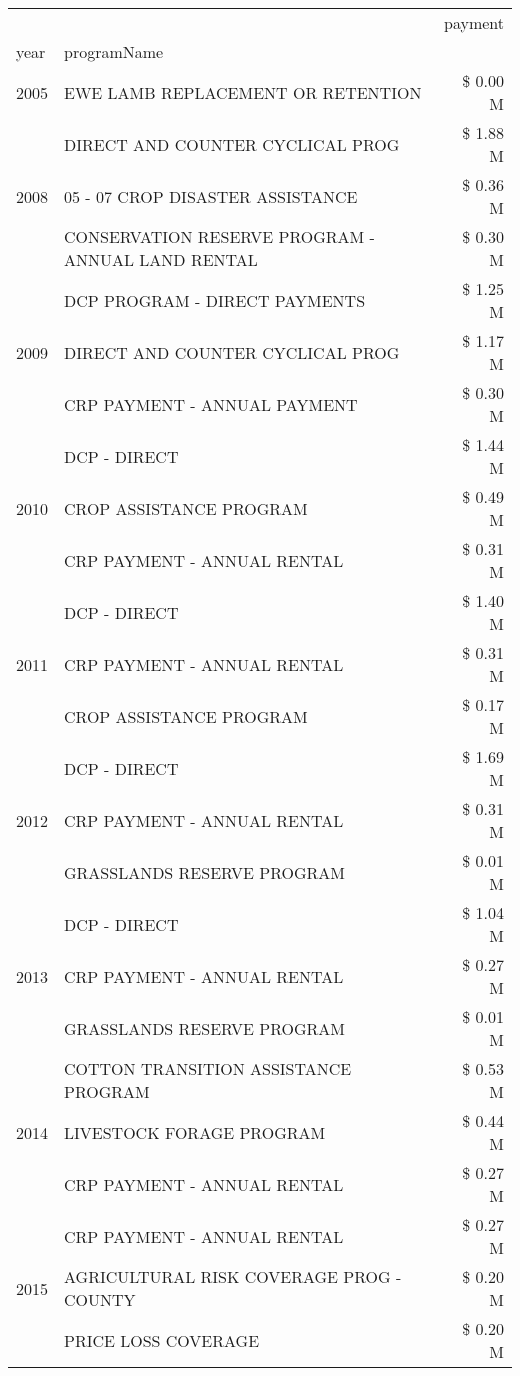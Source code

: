 \begin{tabular}{llr}
\toprule
 &  & payment \\
year & programName &  \\
\midrule
2005 & EWE LAMB REPLACEMENT OR RETENTION & \$ 0.00 M \\
\cline{1-3}
\multirow[t]{3}{*}{2008} & DIRECT AND COUNTER CYCLICAL PROG & \$ 1.88 M \\
 & 05 - 07 CROP DISASTER ASSISTANCE & \$ 0.36 M \\
 & CONSERVATION RESERVE PROGRAM - ANNUAL LAND RENTAL & \$ 0.30 M \\
\cline{1-3}
\multirow[t]{3}{*}{2009} & DCP PROGRAM - DIRECT PAYMENTS & \$ 1.25 M \\
 & DIRECT AND COUNTER CYCLICAL PROG & \$ 1.17 M \\
 & CRP PAYMENT - ANNUAL PAYMENT & \$ 0.30 M \\
\cline{1-3}
\multirow[t]{3}{*}{2010} & DCP - DIRECT & \$ 1.44 M \\
 & CROP ASSISTANCE PROGRAM & \$ 0.49 M \\
 & CRP PAYMENT - ANNUAL RENTAL & \$ 0.31 M \\
\cline{1-3}
\multirow[t]{3}{*}{2011} & DCP - DIRECT & \$ 1.40 M \\
 & CRP PAYMENT - ANNUAL RENTAL & \$ 0.31 M \\
 & CROP ASSISTANCE PROGRAM & \$ 0.17 M \\
\cline{1-3}
\multirow[t]{3}{*}{2012} & DCP - DIRECT & \$ 1.69 M \\
 & CRP PAYMENT - ANNUAL RENTAL & \$ 0.31 M \\
 & GRASSLANDS RESERVE PROGRAM & \$ 0.01 M \\
\cline{1-3}
\multirow[t]{3}{*}{2013} & DCP - DIRECT & \$ 1.04 M \\
 & CRP PAYMENT - ANNUAL RENTAL & \$ 0.27 M \\
 & GRASSLANDS RESERVE PROGRAM & \$ 0.01 M \\
\cline{1-3}
\multirow[t]{3}{*}{2014} & COTTON TRANSITION ASSISTANCE PROGRAM & \$ 0.53 M \\
 & LIVESTOCK FORAGE PROGRAM & \$ 0.44 M \\
 & CRP PAYMENT - ANNUAL RENTAL & \$ 0.27 M \\
\cline{1-3}
\multirow[t]{3}{*}{2015} & CRP PAYMENT - ANNUAL RENTAL & \$ 0.27 M \\
 & AGRICULTURAL RISK COVERAGE PROG - COUNTY & \$ 0.20 M \\
 & PRICE LOSS COVERAGE & \$ 0.20 M \\

\end{tabular}
